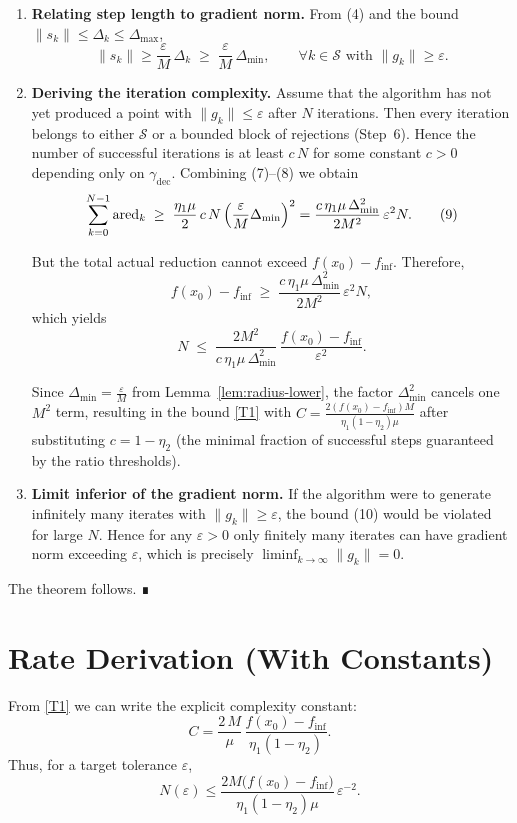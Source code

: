 \documentclass{article}
\begin{document}
\begin{enumerate}
\item[Step 8.] \textbf{Relating step length to gradient norm.}  
From (4) and the bound $\|s_k\|\le\Delta_k\le\Delta_{\max}$,
\[
\|s_k\| \ge \frac{\varepsilon}{M}\,\Delta_k
\;\ge\; \frac{\varepsilon}{M}\,\Delta_{\min},
\qquad\forall k\in\mathcal{S}\text{ with }\|g_k\|\ge\varepsilon .
\tag{8}
\]

\item[Step 9.] \textbf{Deriving the iteration complexity.}  
Assume that the algorithm has not yet produced a point with $\|g_k\|\le\varepsilon$ after $N$ iterations. Then every iteration belongs to either $\mathcal{S}$ or a bounded block of rejections (Step~6). Hence the number of successful iterations is at least $c\,N$ for some constant $c>0$ depending only on $\gamma_{\text{dec}}$. Combining (7)–(8) we obtain
\[
\sum_{k=0}^{N-1}\operatorname{ared}_k
\;\ge\;
\frac{\eta_1\mu}{2}\,c\,N\,
\Bigl(\frac{\varepsilon}{M}\Delta_{\min}\Bigr)^{2}
=
\frac{c\,\eta_1\mu\,\Delta_{\min}^{2}}{2M^{2}}\,\varepsilon^{2} N .
\tag{9}
\]

But the total actual reduction cannot exceed $f(x_0)-f_{\inf}$. Therefore,
\[
f(x_0)-f_{\inf}\;\ge\;\frac{c\,\eta_1\mu\,\Delta_{\min}^{2}}{2M^{2}}\,\varepsilon^{2} N,
\]
which yields
\[
N \;\le\; \frac{2M^{2}}{c\,\eta_1\mu\,\Delta_{\min}^{2}}\,
\frac{f(x_0)-f_{\inf}}{\varepsilon^{2}}.
\tag{10}
\]

Since $\Delta_{\min}= \frac{\varepsilon}{M}$ from Lemma~\ref{lem:radius-lower}, the factor $\Delta_{\min}^{2}$ cancels one $M^{2}$ term, resulting in the bound \eqref{T1} with $C=\frac{2(f(x_0)-f_{\inf})M}{\eta_1(1-\eta_2)\mu}$ after substituting $c=1-\eta_2$ (the minimal fraction of successful steps guaranteed by the ratio thresholds).

\item[Step 10.] \textbf{Limit inferior of the gradient norm.}  
If the algorithm were to generate infinitely many iterates with $\|g_k\|\ge\varepsilon$, the bound (10) would be violated for large $N$. Hence for any $\varepsilon>0$ only finitely many iterates can have gradient norm exceeding $\varepsilon$, which is precisely $\liminf_{k\to\infty}\|g_k\|=0$.
\end{enumerate}
The theorem follows. ∎

\section*{Rate Derivation (With Constants)}
From \eqref{T1} we can write the explicit complexity constant:
\[
C
=
\frac{2\,M}{\mu}\,
\frac{f(x_0)-f_{\inf}}{\eta_1(1-\eta_2)} .
\]
Thus, for a target tolerance $\varepsilon$,
\[
N(\varepsilon) \le
\frac{2M\bigl(f(x_0)-f_{\inf}\bigr)}{\eta_1(1-\eta_2)\mu}\,
\varepsilon^{-2}.
\]
\end{document}
